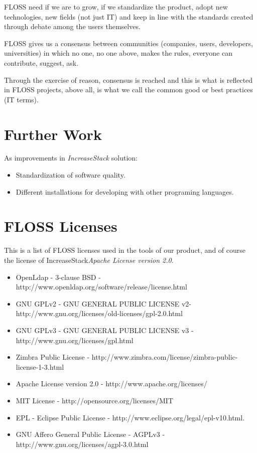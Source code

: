\documentclass[11pt]{scrartcl}
\begin{document}
\par FLOSS need if we are to grow, if we standardize the product, adopt new technologies, new fields (not just IT) and keep in line with the standards created through debate among the users themselves.

\par FLOSS gives us a consensus between communities (companies, users, developers, universities) in which no one, no one above, makes the rules, everyone can contribute, suggest, ask.

\par Through the exercise of reason, consensus is reached and this is what is reflected in FLOSS projects, above all, is what we call the common good or best practices (IT terms).

\section{Further Work}

\par As improvements in \emph{IncreaseStack} solution:

\begin{itemize}
	\item Standardization of software quality. 
	\item Different installations for developing with other programing languages.
\end{itemize}

\section{FLOSS Licenses}\label{lic:floss}

This is a list of FLOSS licenses used in the tools of our product, and of course the license of IncreaseStack\emph{Apache License version 2.0}.

\begin{itemize}
    \item OpenLdap - 3-clause BSD - http://www.openldap.org/software/release/license.html
    \item GNU GPLv2 - GNU GENERAL PUBLIC LICENSE v2- http://www.gnu.org/licenses/old-licenses/gpl-2.0.html
    \item GNU GPLv3 - GNU GENERAL PUBLIC LICENSE v3 - http://www.gnu.org/licenses/gpl.html
    \item Zimbra Public License - http://www.zimbra.com/license/zimbra-public-license-1-3.html
    \item Apache License version 2.0 - http://www.apache.org/licenses/
    \item MIT License - http://opensource.org/licenses/MIT
    \item EPL - Eclipse Public License - http://www.eclipse.org/legal/epl-v10.html.
    \item GNU Affero General Public License - AGPLv3 - http://www.gnu.org/licenses/agpl-3.0.html
\end{itemize}
\end{document}
